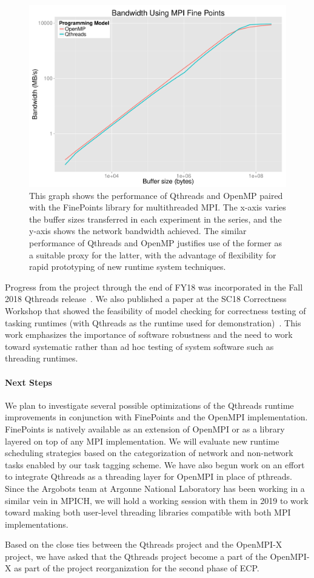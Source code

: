 \begin{figure}[htb]
	\centering
	\includegraphics[width=6in]{projects/2.3.1-PMR/2.3.1.15-Qthreads/FinePointsBW-QtOmp.pdf}
	\caption{\label{fig:qthreads-finepoints-graph}This graph shows the performance of Qthreads and OpenMP paired with the FinePoints library for multithreaded MPI.  The x-axis varies the buffer sizes transferred in each experiment in the series, and the y-axis shows the network bandwidth achieved.  The similar performance of Qthreads and OpenMP justifies use of the former as a suitable proxy for the latter, with the advantage of flexibility for rapid prototyping of new runtime system techniques.}
\end{figure}

Progress from the project through the end of FY18 was incorporated in the Fall 2018 Qthreads release~\cite{qthreads-github}.  We also published a paper at the SC18 Correctness Workshop that showed the feasibility of model checking for correctness testing of tasking runtimes (with Qthreads as the runtime used for demonstration)~\cite{evans2018qthreads-model}.  This work emphasizes the importance of software robustness and the need to work toward systematic rather than ad hoc testing of system software such as threading runtimes.

\paragraph{Next Steps}

We plan to investigate several possible optimizations of the Qthreads runtime improvements in conjunction with FinePoints and the OpenMPI implementation. FinePoints is natively available as an extension of OpenMPI or as a library layered on top of any MPI implementation. We will evaluate new runtime scheduling strategies based on the categorization of network and non-network tasks enabled by our task tagging scheme. We have also begun work on an effort to integrate Qthreads as a threading layer for OpenMPI in place of pthreads. Since the Argobots team at Argonne National Laboratory has been working in a similar vein in MPICH, we will hold a working session with them in 2019 to work toward making both user-level threading libraries compatible with both MPI implementations.

Based on the close ties between the Qthreads project and the OpenMPI-X project, we have asked that the Qthreads project become a part of the OpenMPI-X as part of the project reorganization for the second phase of ECP.

